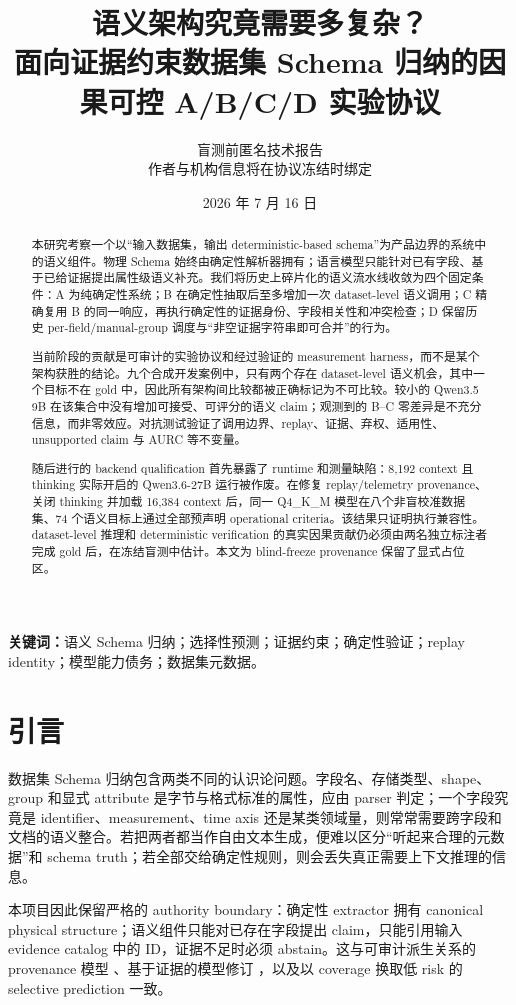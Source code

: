 \documentclass[UTF8,fontset=fandol,11pt]{ctexart}
\title{\textbf{语义架构究竟需要多复杂？}\\
\large 面向证据约束数据集 Schema 归纳的因果可控 A/B/C/D 实验协议}
\author{盲测前匿名技术报告\\
\small 作者与机构信息将在协议冻结时绑定}
\date{2026 年 7 月 16 日}
\begin{document}
\maketitle

\begin{abstract}
本研究考察一个以“输入数据集，输出 deterministic-based schema”为产品边界的系统中的语义组件。物理 Schema 始终由确定性解析器拥有；语言模型只能针对已有字段、基于已给证据提出属性级语义补充。我们将历史上碎片化的语义流水线收敛为四个固定条件：A 为纯确定性系统；B 在确定性抽取后至多增加一次 dataset-level 语义调用；C 精确复用 B 的同一响应，再执行确定性的证据身份、字段相关性和冲突检查；D 保留历史 per-field/manual-group 调度与“非空证据字符串即可合并”的行为。

当前阶段的贡献是可审计的实验协议和经过验证的 measurement harness，而不是某个架构获胜的结论。九个合成开发案例中，只有两个存在 dataset-level 语义机会，其中一个目标不在 gold 中，因此所有架构间比较都被正确标记为不可比较。较小的 Qwen3.5 9B 在该集合中没有增加可接受、可评分的语义 claim；观测到的 B--C 零差异是不充分信息，而非零效应。对抗测试验证了调用边界、replay、证据、弃权、适用性、unsupported claim 与 AURC 等不变量。

随后进行的 backend qualification 首先暴露了 runtime 和测量缺陷：8,192 context 且 thinking 实际开启的 Qwen3.6-27B 运行被作废。在修复 replay/telemetry provenance、关闭 thinking 并加载 16,384 context 后，同一 Q4\_K\_M 模型在八个非盲校准数据集、74 个语义目标上通过全部预声明 operational criteria。该结果只证明执行兼容性。dataset-level 推理和 deterministic verification 的真实因果贡献仍必须由两名独立标注者完成 gold 后，在冻结盲测中估计。本文为 blind-freeze provenance 保留了显式占位区。
\end{abstract}

\noindent\textbf{关键词：}语义 Schema 归纳；选择性预测；证据约束；确定性验证；replay identity；模型能力债务；数据集元数据。

\section{引言}

数据集 Schema 归纳包含两类不同的认识论问题。字段名、存储类型、shape、group 和显式 attribute 是字节与格式标准的属性，应由 parser 判定；一个字段究竟是 identifier、measurement、time axis 还是某类领域量，则常常需要跨字段和文档的语义整合。若把两者都当作自由文本生成，便难以区分“听起来合理的元数据”和 schema truth；若全部交给确定性规则，则会丢失真正需要上下文推理的信息。

本项目因此保留严格的 authority boundary：确定性 extractor 拥有 canonical physical structure；语义组件只能对已存在字段提出 claim，只能引用输入 evidence catalog 中的 ID，证据不足时必须 abstain。这与可审计派生关系的 provenance 模型 \cite{prov2013}、基于证据的模型修订 \cite{gao2023rarr}，以及以 coverage 换取低 risk 的 selective prediction \cite{geifman2017selective} 一致。
\end{document}
